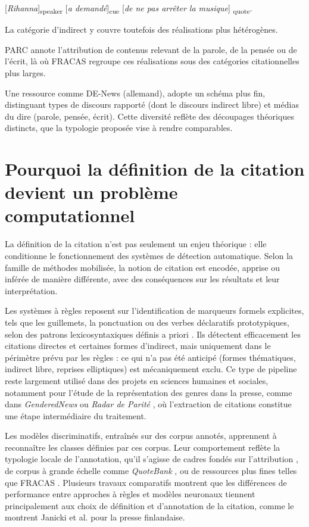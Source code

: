 \documentclass[final,fra]{anthology-ch}         %
\begin{document}
{[}\emph{Rihanna}{]}\textsubscript{speaker} {[}\emph{a
demandé}{]}\textsubscript{cue} {[}\emph{de ne pas arrêter la musique}{]}
\textsubscript{quote}.

\noindent La catégorie d'indirect y couvre toutefois des réalisations plus
hétérogènes.

PARC annote l'attribution de contenus relevant de la parole, de la
pensée ou de l'écrit, là où FRACAS regroupe ces réalisations sous des
catégories citationnelles plus larges.

Une ressource comme DE-News (allemand), adopte un schéma plus fin,
distinguant types de discours rapporté (dont le discours indirect libre)
et médias du dire (parole, pensée, écrit). Cette diversité reflète des
découpages théoriques distincts, que la typologie proposée vise à rendre
comparables.

\section{Pourquoi la définition de la citation devient un problème computationnel}

La définition de la citation n'est pas seulement un enjeu théorique :
elle conditionne le fonctionnement des systèmes de détection
automatique. Selon la famille de méthodes mobilisée, la notion de
citation est encodée, apprise ou inférée de manière différente, avec des
conséquences sur les résultats et leur interprétation.

Les systèmes à règles reposent sur l'identification de marqueurs formels
explicites, tels que les guillemets, la ponctuation ou des verbes
déclaratifs prototypiques, selon des patrons lexicosyntaxiques définis a
priori \cite{pouliquen2007automatic}. Ils détectent efficacement les
citations directes et certaines formes d'indirect, mais uniquement dans
le périmètre prévu par les règles : ce qui n'a pas été anticipé (formes
thématiques, indirect libre, reprises elliptiques) est mécaniquement
exclu. Ce type de pipeline reste largement utilisé dans des projets en
sciences humaines et sociales, notamment pour l'étude de la
représentation des genres dans la presse, comme dans \textit{GenderedNews}
\cite{richard2022genderednews} ou \textit{Radar de Parité} \cite{soumah2023radar}, où
l'extraction de citations constitue une étape intermédiaire du
traitement.

Les modèles discriminatifs, entraînés sur des corpus annotés, apprennent
à reconnaître les classes définies par ces corpus. Leur comportement
reflète la typologie locale de l'annotation, qu'il s'agisse de cadres
fondés sur l'attribution \cite{pareti2012database}, de corpus à grande échelle
comme \textit{QuoteBank} \cite{vaucher2021quotebank}, ou de ressources plus fines
telles que FRACAS \cite{richard2024fracas}. Plusieurs travaux comparatifs
montrent que les différences de performance entre approches à règles et
modèles neuronaux tiennent principalement aux choix de définition et
d'annotation de la citation, comme le montrent Janicki et al. \cite{janicki2023detection}
pour la presse finlandaise.
\end{document}
